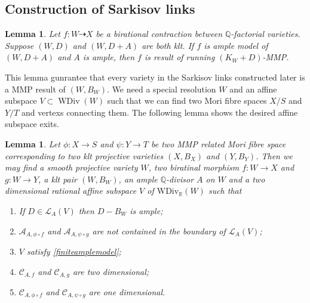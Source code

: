\documentclass{article}
\newtheorem{lem}[defn]{Lemma}
\begin{document}
\subsection{Construction of Sarkisov links}
\begin{lem}
  Let $f:W\dashrightarrow X $ be a birational contraction between $\mathbb{Q}$-factorial varieties. Suppose $(W,D)$ and $(W,D+A)$ are both klt. If $f$ is ample model of $(W,D+A)$ and $A$ is ample, then $f$ is result of running $(K_{W}+D)$-MMP.
\end{lem}
This lemma gunrantee that every variety in the Sarkisov links constructed later is a MMP result of $(W,B_{W})$.
We need a special resolution $W$ and an   affine subspace $V \subset \operatorname{WDiv}(W)$ such that we can find two Mori fibre spaces $X/S$ and $Y/T$ and vertexs connecting them. The following  lemma shows the desired affine subspace exits. 
\begin{lem}\label{keylemma}
  Let $ \phi:X\to S $ and $ \psi :Y\to T  $ be two MMP related Mori fibre space corresponding to two klt projective varieties $ (X,B_X) $ and $ (Y,B_Y) $. Then we may find a smooth projective variety $ W $, two biratinal morphism $ f:W\to X $ and $ g:W\to Y $, a klt pair $ (W,B_{W}) $, an ample $ \mathbb{Q} $-divisor $ A $ on $ W $ and a two dimensional rational affine subspace $ V $ of $ \mathrm{WDiv}_\mathbb{R}(W) $ such that 
  \begin{enumerate}[1]
    \item If $ D\in \mathcal{L}_A(V) $ then $ D-B_W $ is ample;
    \item $ \mathcal{A}_{A,\phi\circ f} $ and $ \mathcal{A}_{A,\psi\circ g} $ are not contained in the boundary of $ \mathcal{L}_A(V) $;
    \item $ V $ satisfy \ref{finiteamplemodel};
    \item $ \mathcal{C}_{A,f} $ and $ \mathcal{C}_{A,g} $ are two dimensional;
    \item $ \mathcal{C}_{A,\phi\circ f} $ and $ \mathcal{C}_{A,\psi\circ g} $ are one dimensional.
  \end{enumerate}
\end{lem}
\end{document}
